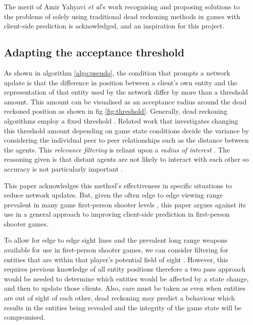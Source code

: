 \documentclass[journal]{IEEEtran}
\begin{document}
The merit of Amir Yahyavi \textit{et al}'s work \cite{yahyavi2011antreckoning} \cite{yahyavi2013interest} recognising and proposing solutions to the problems of solely using traditional dead reckoning methods in games with client-side prediction is acknowledged, and an inspiration for this project.

\subsection{Adapting the acceptance threshold} \label{adaptingThreshold}

As shown in algorithm \ref{algo:pseudo}, the condition that prompts a network update is that the difference in position between a client's own entity and the representation of that entity used by the network differ by more than a threshold amount. This amount can be visualised as an acceptance radius around the dead reckoned position as shown in fig \ref{fig:threshold}. Generally, dead reckoning algorithms employ a fixed threshold \cite{cai1999auto}. Related work that investigates changing this threshold amount depending on game state conditions decide the variance by considering the individual peer to peer relationships such as the distance between the agents. This \textit{relevance filtering} is reliant upon a \textit{radius of interest} \cite{rak1996evaluation}. The reasoning given is that distant agents are not likely to interact with each other so accuracy is not particularly important \cite{cai1999auto} \cite{jaya2016combining}.

This paper acknowledges this method's effectiveness in specific situations to reduce network updates. But, given the often edge to edge viewing range prevalent in many game first-person shooter levels \cite{toby2014tobyscs} \cite{ziervogel2014nag} \cite{cod2018wikibo4}, this paper argues against its use in a general approach to improving client-side prediction in first-person shooter games.

To allow for edge to edge sight lines and the prevalent long range weapons available for use in first-person shooter games, we can consider filtering for entities that are within that player’s potential field of sight \cite{cronin2001distributed}. However, this requires previous knowledge of all entity positions therefore a two pass approach would be needed to determine which entities would be affected by a state change, and then to update those clients. Also, care must be taken as even when entities are out of sight of each other, dead reckoning may predict a behaviour which results in the entities being revealed and the integrity of the game state will be compromised.
\end{document}
